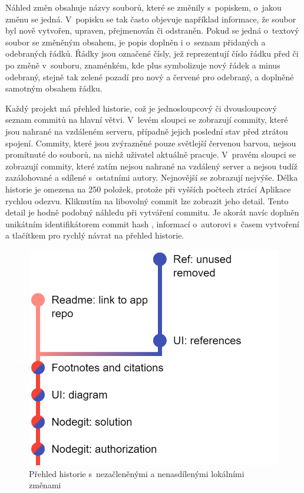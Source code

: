 Náhled změn obsahuje názvy souborů, které se změnily s~popiskem, o~jakou změnu se jedná. V~popisku se tak často objevuje například informace, že soubor byl nově vytvořen, upraven, přejmenován či odstraněn. Pokud se jedná o~textový soubor se změněným obsahem, je popis doplněn i o~seznam přidaných a odebraných řádků. Řádky jsou označené čísly, jež reprezentují číslo řádku před či po změně v~souboru, znaménkém, kde plus symbolizuje nový řádek a minus odebraný, stejně tak zelené pozadí pro nový a červené pro odebraný, a doplněné samotným obsahem řádku.

Každý projekt má přehled historie, což je jednosloupcový či dvousloupcový seznam commitů na hlavní větvi. V~levém sloupci se zobrazují commity, které jsou nahrané na vzdáleném serveru, případně jejich poslední stav před ztrátou spojení. Commity, které jsou zvýrazněné pouze světlejší červenou barvou, nejsou promítnuté do souborů, na nichž uživatel aktuálně pracuje. V~pravém sloupci se zobrazují commity, které zatím nejsou nahrané na vzdálený server a nejsou tudíž zazálohované a sdílené s~ostatními autory. Nejnovější se zobrazují nejvýše. Délka historie je omezena na 250 položek, protože při vyšších počtech ztrácí Aplikace rychlou odezvu. Kliknutím na libovolný commit lze zobrazit jeho detail. Tento detail je hodně podobný náhledu při vytváření commitu. Je akorát navíc doplněn unikátním identifikátorem commit hash \cite{commit-hash}, informací o~autorovi s~časem vytvoření a tlačítkem pro rychlý návrat na přehled historie.

\FloatBarrier
\begin{figure}[ht]
	\centering
	\includegraphics[scale=0.5]{sections/ui/images/history.png}
	\caption[Historie]{Přehled historie s~nezačleněnými a nenasdílenými lokálními změnami}
	\label{fig:history}
\end{figure}
\FloatBarrier

